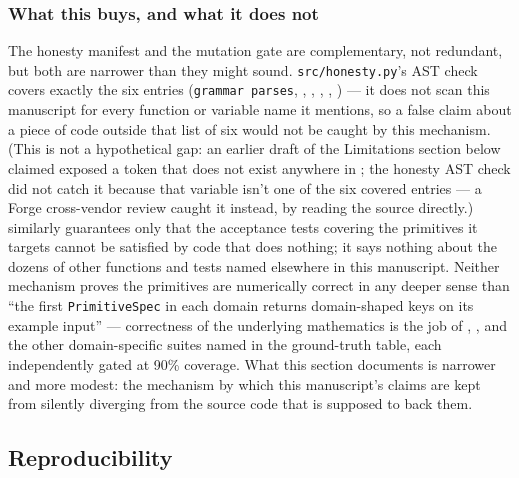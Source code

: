 \documentclass[
]{article}
\begin{document}
\subsubsection{What this buys, and what it does
not}\label{what-this-buys-and-what-it-does-not}

The honesty manifest and the mutation gate are complementary, not
redundant, but both are narrower than they might sound.
\texttt{src/honesty.py}'s AST check covers exactly the six
 entries (\texttt{grammar\ parses},
, ,
, ,
) --- it does not scan this manuscript for
every function or variable name it mentions, so a false claim about a
piece of code outside that list of six would not be caught by this
mechanism. (This is not a hypothetical gap: an earlier draft of the
Limitations section below claimed  exposed a
 token that does not exist anywhere in
; the honesty AST check did not
catch it because that variable isn't one of the six covered entries ---
a Forge cross-vendor review caught it instead, by reading the source
directly.)  similarly guarantees only that
the acceptance tests covering the primitives it targets cannot be
satisfied by code that does nothing; it says nothing about the dozens of
other functions and tests named elsewhere in this manuscript. Neither
mechanism proves the primitives are numerically correct in any deeper
sense than ``the first \texttt{PrimitiveSpec} in each domain returns
domain-shaped keys on its example input'' --- correctness of the
underlying mathematics is the job of
,
, and the other domain-specific
suites named in the ground-truth table, each independently gated at 90\%
coverage. What this section documents is narrower and more modest: the
mechanism by which this manuscript's claims are kept from silently
diverging from the source code that is supposed to back them.

\newpage

\subsection{Reproducibility}\label{reproducibility}
\end{document}
